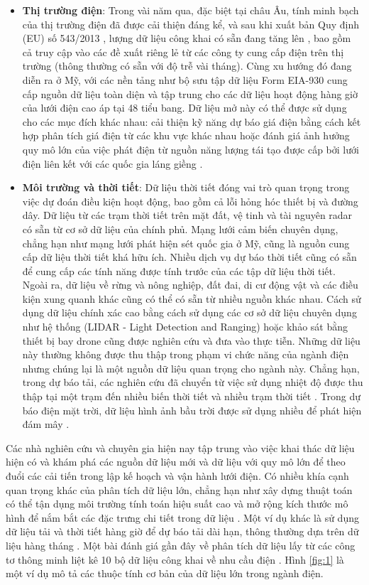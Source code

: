 \documentclass[utf8]{frontiersSCNS} %
\begin{document}
\begin{itemize}
	\item \textbf{Thị trường điện}: Trong vài năm qua, đặc biệt tại châu Âu, tính minh bạch của thị trường điện đã được cải thiện đáng kể, và sau khi xuất bản Quy định (EU) số 543/2013 \citep{EU2013}, lượng dữ liệu công khai có sẵn đang tăng lên \citep{Hirth2018}, bao gồm cả truy cập vào các đề xuất riêng lẻ từ các công ty cung cấp điện trên thị trường (thông thường có sẵn với độ trễ vài tháng). Cùng xu hướng đó đang diễn ra ở Mỹ, với các nền tảng như bộ sưu tập dữ liệu Form EIA-930 cung cấp nguồn dữ liệu toàn diện và tập trung cho các dữ liệu hoạt động hàng giờ của lưới điện cao áp tại 48 tiểu bang. Dữ liệu mở này có thể được sử dụng cho các mục đích khác nhau: cải thiện kỹ năng dự báo giá điện bằng cách kết hợp phân tích giá điện từ các khu vực khác nhau \citep{Ziel2018} hoặc đánh giá ảnh hưởng quy mô lớn của việc phát điện từ nguồn năng lượng tái tạo được cấp bởi lưới điện liên kết với các quốc gia láng giềng \citep{Zugno2013}.
	
	\item \textbf{Môi trường và thời tiết}: Dữ liệu thời tiết đóng vai trò quan trọng trong việc dự đoán điều kiện hoạt động, bao gồm cả lỗi hỏng hóc thiết bị và đường dây. Dữ liệu từ các trạm thời tiết trên mặt đất, vệ tinh và tài nguyên radar có sẵn từ cơ sở dữ liệu của chính phủ. Mạng lưới cảm biến chuyên dụng, chẳng hạn như mạng lưới phát hiện sét quốc gia ở Mỹ, cũng là nguồn cung cấp dữ liệu thời tiết khá hữu ích. Nhiều dịch vụ dự báo thời tiết cũng có sẵn để cung cấp các tính năng được tính trước của các tập dữ liệu thời tiết. Ngoài ra, dữ liệu về rừng và nông nghiệp, đất đai, di cư động vật và các điều kiện xung quanh khác cũng có thể có sẵn từ nhiều nguồn khác nhau. Cách sử dụng dữ liệu chính xác cao bằng cách sử dụng các cơ sở dữ liệu chuyên dụng như hệ thống (LIDAR - Light Detection and Ranging) hoặc khảo sát bằng thiết bị bay drone cũng được nghiên cứu và đưa vào thực tiễn. Những dữ liệu này thường không được thu thập trong phạm vi chức năng của ngành điện nhưng chúng lại là một nguồn dữ liệu quan trọng cho ngành này. Chẳng hạn, trong dự báo tải, các nghiên cứu đã chuyển từ việc sử dụng nhiệt độ được thu thập tại một trạm đến nhiều biến thời tiết và nhiều trạm thời tiết \citep{Hong2015}. Trong dự báo điện mặt trời, dữ liệu hình ảnh bầu trời được sử dụng nhiều để phát hiện đám mây \citep{Kleissl2013}.
\end{itemize}

Các nhà nghiên cứu và chuyên gia hiện nay tập trung vào việc khai thác dữ liệu hiện có và khám phá các nguồn dữ liệu mới và dữ liệu với quy mô lớn để theo đuổi các cải tiến trong lập kế hoạch và vận hành lưới điện. Có nhiều khía cạnh quan trọng khác của phân tích dữ liệu lớn, chẳng hạn như xây dựng thuật toán có thể tận dụng môi trường tính toán hiệu suất cao và mở rộng kích thước mô hình để nắm bắt các đặc trưng chi tiết trong dữ liệu \citep{Wang2016}. Một ví dụ khác là sử dụng dữ liệu tải và thời tiết hàng giờ để dự báo tải dài hạn, thông thường dựa trên dữ liệu hàng tháng \citep{Hyndman2009,Hong2014}. Một bài đánh giá gần đây về phân tích dữ liệu lấy từ các công tơ thông minh liệt kê 10 bộ dữ liệu công khai về nhu cầu điện \citep{Wang2018}. Hình \ref{fig:1} là một ví dụ mô tả các thuộc tính cơ bản của dữ liệu lớn trong ngành điện.
\end{document}
